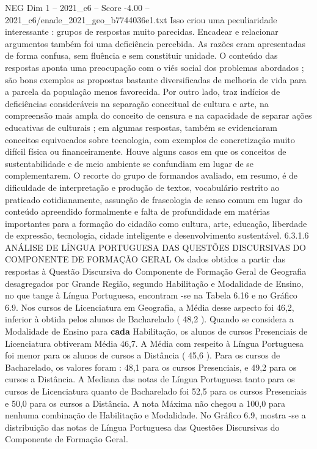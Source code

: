 \begin{textsample}{NEG Dim 1 – 2021\_c6 – Score -4.00 – 2021\_c6/enade\_2021\_geo\_b7744036e1.txt}
Isso criou uma peculiaridade interessante : grupos de respostas muito parecidas.
Encadear e relacionar argumentos também foi uma deficiência percebida.
As razões eram apresentadas de forma confusa, sem fluência e sem constituir unidade.
O conteúdo das respostas aponta uma preocupação com o viés social dos problemas abordados ; são bons exemplos as propostas bastante diversificadas de melhoria de vida para a parcela da população menos favorecida.
Por outro lado, traz indícios de deficiências consideráveis na separação conceitual de cultura e arte, na compreensão mais ampla do conceito de censura e na capacidade de separar ações educativas de culturais ; em algumas respostas, também se evidenciaram conceitos equivocados sobre tecnologia, com exemplos de concretização muito difícil física ou financeiramente.
Houve alguns casos em que os conceitos de sustentabilidade e de meio ambiente se confundiam em lugar de se complementarem.
O recorte do grupo de formandos avaliado, em resumo, é de dificuldade de interpretação e produção de textos, vocabulário restrito ao praticado cotidianamente, assunção de fraseologia de senso comum em lugar do conteúdo apreendido formalmente e falta de profundidade em matérias importantes para a formação do cidadão como cultura, arte, educação, liberdade de expressão, tecnologia, cidade inteligente e desenvolvimento sustentável. 6.3.1.6 ANÁLISE DE LÍNGUA PORTUGUESA DAS QUESTÕES DISCURSIVAS DO COMPONENTE DE FORMAÇÃO GERAL Os dados obtidos a partir das respostas à Questão Discursiva do Componente de Formação Geral de Geografia desagregados por Grande Região, segundo Habilitação e Modalidade de Ensino, no que tange à Língua Portuguesa, encontram -se na Tabela 6.16 e no Gráfico 6.9.
Nos cursos de Licenciatura em Geografia, a Média desse aspecto foi 46,2, inferior à obtida pelos alunos de Bacharelado ( 48,2 ).
Quando se considera a Modalidade de Ensino para \textbf{cada} Habilitação, os alunos de cursos Presenciais de Licenciatura obtiveram Média 46,7.
A Média com respeito à Língua Portuguesa foi menor para os alunos de cursos a Distância ( 45,6 ).
Para os cursos de Bacharelado, os valores foram : 48,1 para os cursos Presenciais, e 49,2 para os cursos a Distância.
A Mediana das notas de Língua Portuguesa tanto para os cursos de Licenciatura quanto de Bacharelado foi 52,5 para os cursos Presenciais e 50,0 para os cursos a Distância.
A nota Máxima não chegou a 100,0 para nenhuma combinação de Habilitação e Modalidade.
No Gráfico 6.9, mostra -se a distribuição das notas de Língua Portuguesa das Questões Discursivas do Componente de Formação Geral.

\end{textsample}
